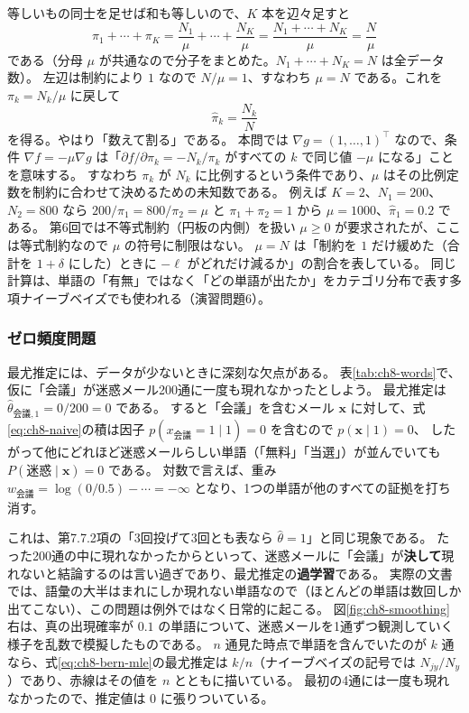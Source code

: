 等しいもの同士を足せば和も等しいので、$K$ 本を辺々足すと
\begin{equation*}
  \pi_1 + \cdots + \pi_K = \frac{N_1}{\mu} + \cdots + \frac{N_K}{\mu} = \frac{N_1 + \cdots + N_K}{\mu} = \frac{N}{\mu}
\end{equation*}
である（分母 $\mu$ が共通なので分子をまとめた。$N_1 + \cdots + N_K = N$ は全データ数）。
左辺は制約により $1$ なので $N/\mu = 1$、すなわち $\mu = N$ である。これを $\pi_k = N_k/\mu$ に戻して
\begin{equation}
  \hat{\pi}_k = \frac{N_k}{N}
  \label{eq:ch8-cat-mle}
\end{equation}
を得る。やはり「数えて割る」である。
本問では $\nabla g = (1, \ldots, 1)^\top$ なので、条件 $\nabla f = -\mu\nabla g$ は「$\partial f/\partial\pi_k = -N_k/\pi_k$ がすべての $k$ で同じ値 $-\mu$ になる」ことを意味する。
すなわち $\pi_k$ が $N_k$ に比例するという条件であり、$\mu$ はその比例定数を制約に合わせて決めるための未知数である。
例えば $K = 2$、$N_1 = 200$、$N_2 = 800$ なら $200/\pi_1 = 800/\pi_2 = \mu$ と $\pi_1 + \pi_2 = 1$ から $\mu = 1000$、$\hat{\pi}_1 = 0.2$ である。
第6回では不等式制約（円板の内側）を扱い $\mu \geq 0$ が要求されたが、ここは等式制約なので $\mu$ の符号に制限はない。
$\mu = N$ は「制約を $1$ だけ緩めた（合計を $1 + \delta$ にした）ときに $-\ell$ がどれだけ減るか」の割合を表している。
同じ計算は、単語の「有無」ではなく「どの単語が出たか」をカテゴリ分布で表す多項ナイーブベイズでも使われる（演習問題6）。

\subsubsection{ゼロ頻度問題}

最尤推定には、データが少ないときに深刻な欠点がある。
表\ref{tab:ch8-words}で、仮に「会議」が迷惑メール200通に一度も現れなかったとしよう。
最尤推定は $\hat{\theta}_{\text{会議},1} = 0/200 = 0$ である。
すると「会議」を含むメール $\bm{x}$ に対して、式\eqref{eq:ch8-naive}の積は因子 $p(x_{\text{会議}} = 1 \mid 1) = 0$ を含むので $p(\bm{x} \mid 1) = 0$、
したがって他にどれほど迷惑メールらしい単語（「無料」「当選」）が並んでいても $P(\text{迷惑} \mid \bm{x}) = 0$ である。
対数で言えば、重み $w_{\text{会議}} = \log(0/0.5) - \cdots = -\infty$ となり、1つの単語が他のすべての証拠を打ち消す。

これは、第7.7.2項の「3回投げて3回とも表なら $\hat{\theta} = 1$」と同じ現象である。
たった200通の中に現れなかったからといって、迷惑メールに「会議」が\textbf{決して}現れないと結論するのは言い過ぎであり、最尤推定の\textbf{過学習}である。
実際の文書では、語彙の大半はまれにしか現れない単語なので（ほとんどの単語は数回しか出てこない）、この問題は例外ではなく日常的に起こる。
図\ref{fig:ch8-smoothing}右は、真の出現確率が $0.1$ の単語について、迷惑メールを1通ずつ観測していく様子を乱数で模擬したものである。
$n$ 通見た時点で単語を含んでいたのが $k$ 通なら、式\eqref{eq:ch8-bern-mle}の最尤推定は $k/n$（ナイーブベイズの記号では $N_{jy}/N_y$）であり、赤線はその値を $n$ とともに描いている。
最初の4通には一度も現れなかったので、推定値は $0$ に張りついている。

